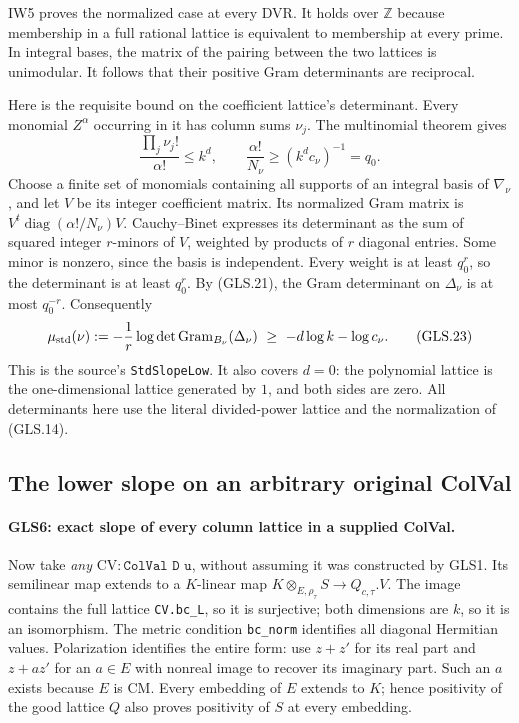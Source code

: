 IW5 proves the normalized case at every DVR.  It holds over $\mathbb Z$ because
membership in a full rational lattice is equivalent to membership
at every prime.  In integral bases, the matrix of the pairing between
the two lattices is unimodular.  It follows that their positive Gram
determinants are reciprocal.

Here is the requisite bound on the coefficient lattice's determinant.
Every monomial $Z^\alpha$ occurring in it has column sums $\nu_j$.
The multinomial theorem gives
\[
 \frac{\prod_j\nu_j!}{\alpha!}\le k^d,
 \qquad \frac{\alpha!}{N_\nu}\ge
                        (k^d c_\nu)^{-1}=q_0.\tag{GLS.22}
\]
Choose a finite set of monomials containing all supports of an
integral basis of $\nabla_\nu$, and let $V$ be its integer
coefficient matrix.  Its normalized Gram matrix is
$V^t\operatorname{diag}(\alpha!/N_\nu)V$.
Cauchy--Binet expresses its determinant as the sum of squared
integer $r$-minors of $V$, weighted by products of $r$ diagonal
entries.  Some minor is nonzero, since the basis is independent.
Every weight is at least $q_0^r$, so the determinant is at least
$q_0^r$.  By (GLS.21), the Gram determinant on $\Delta_\nu$ is at
most $q_0^{-r}$.  Consequently
\[
 \mu_{\rm std}(\nu)
 :=-\frac1r\log\det\operatorname{Gram}_{B_\nu}(\Delta_\nu)
 \ \ge\ -d\log k-\log c_\nu.                 \tag{GLS.23}
\]
This is the source's \texttt{StdSlopeLow}.  It also covers $d=0$:
the polynomial lattice is the one-dimensional lattice generated by
$1$, and both sides are zero.  All determinants here use the literal
divided-power lattice and the normalization of (GLS.14).

\subsection{The lower slope on an arbitrary original ColVal}

\paragraph{GLS6: exact slope of every column lattice in a supplied ColVal.}
\label{claim:GLS6}
Now take \emph{any} $\mathrm{CV}:\texttt{ColVal D u}$, without
assuming it was constructed by GLS1.  Its semilinear map extends to
a $K$-linear map $K\otimes_{E,\rho_\tau}S\to Q_{c,\tau}.V$.
The image contains the full lattice \texttt{CV.bc\_L}, so it is
surjective; both dimensions are $k$, so it is an isomorphism.
The metric condition \texttt{bc\_norm} identifies all diagonal
Hermitian values.  Polarization identifies the entire form: use
$z+z'$ for its real part and $z+az'$ for an $a\in E$ with nonreal
image to recover its imaginary part.  Such an $a$ exists because
$E$ is CM.  Every embedding of $E$ extends to $K$; hence positivity
of the good lattice $Q$ also proves positivity of $S$ at every
embedding.

